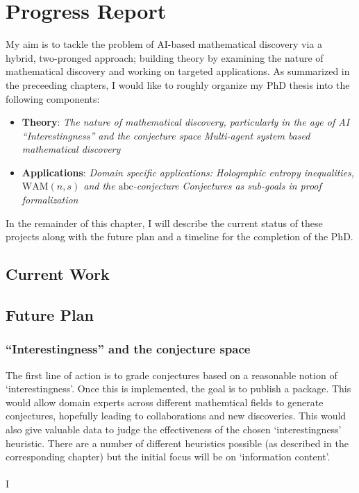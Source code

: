 \chapter{Progress Report}
My aim is to tackle the problem of AI-based mathematical discovery via a hybrid, two-pronged approach; building theory by examining the nature of mathematical discovery and working on targeted applications.
As summarized in the preceeding chapters, I would like to roughly organize my PhD thesis into the following components:
\begin{itemize}
    \item \textbf{Theory}:
        \subitem \textit{The nature of mathematical discovery, particularly in the age of AI}
        \subitem \textit{``Interestingness'' and the conjecture space}
        \subitem \textit{Multi-agent system based mathematical discovery}
    \item \textbf{Applications}:
        \subitem \textit{Domain specific applications: Holographic entropy inequalities, $\text{WAM}(n,s)$ and the $\text{abc}$-conjecture}
        \subitem \textit{Conjectures as sub-goals in proof formalization} 
\end{itemize}
In the remainder of this chapter, I will describe the current status of these projects along with the future plan and a timeline for the completion of the PhD.

\section{Current Work}

\section{Future Plan}
\subsection{``Interestingness'' and the conjecture space}
The first line of action is to grade conjectures based on a reasonable notion of `interestingness'. Once this is implemented, the goal is to publish a package. This would allow domain experts across different mathemtical fields to generate conjectures, hopefully leading to collaborations and new discoveries.
This would also give valuable data to judge the effectiveness of the chosen `interestingness' heuristic. There are a number of different heuristics possible (as described in the corresponding chapter) but the initial focus will be on `information content'.
\\\\
I

